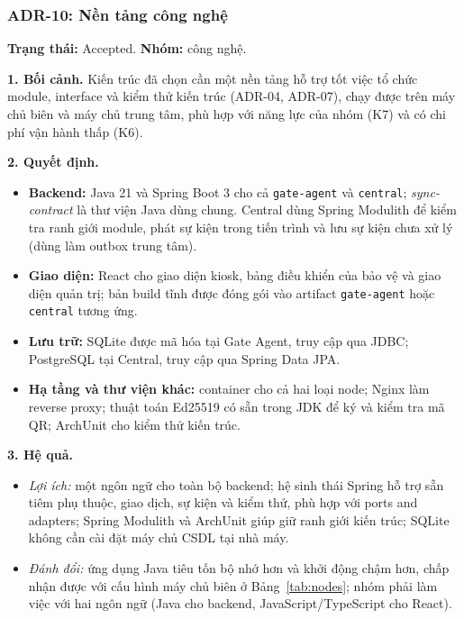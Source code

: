 \subsubsection{ADR-10: Nền tảng công nghệ}\label{adr:10}
\textbf{Trạng thái:} Accepted. \textbf{Nhóm:} công nghệ.

\noindent\textbf{1. Bối cảnh.} Kiến trúc đã chọn cần một nền tảng hỗ trợ tốt việc tổ chức module, interface và kiểm thử kiến trúc (ADR-04, ADR-07), chạy được trên máy chủ biên và máy chủ trung tâm, phù hợp với năng lực của nhóm (K7) và có chi phí vận hành thấp (K6).

\noindent\textbf{2. Quyết định.}
\begin{itemize}
    \item \textbf{Backend:} Java 21 và Spring Boot 3 cho cả \texttt{gate-agent} và \texttt{central}; \textit{sync-contract} là thư viện Java dùng chung. Central dùng Spring Modulith để kiểm tra ranh giới module, phát sự kiện trong tiến trình và lưu sự kiện chưa xử lý (dùng làm outbox trung tâm).
    \item \textbf{Giao diện:} React cho giao diện kiosk, bảng điều khiển của bảo vệ và giao diện quản trị; bản build tĩnh được đóng gói vào artifact \texttt{gate-agent} hoặc \texttt{central} tương ứng.
    \item \textbf{Lưu trữ:} SQLite được mã hóa tại Gate Agent, truy cập qua JDBC; PostgreSQL tại Central, truy cập qua Spring Data JPA.
    \item \textbf{Hạ tầng và thư viện khác:} container cho cả hai loại node; Nginx làm reverse proxy; thuật toán Ed25519 có sẵn trong JDK để ký và kiểm tra mã QR; ArchUnit cho kiểm thử kiến trúc.
\end{itemize}

\noindent\textbf{3. Hệ quả.}
\begin{itemize}
    \item \textit{Lợi ích:} một ngôn ngữ cho toàn bộ backend; hệ sinh thái Spring hỗ trợ sẵn tiêm phụ thuộc, giao dịch, sự kiện và kiểm thử, phù hợp với ports and adapters; Spring Modulith và ArchUnit giúp giữ ranh giới kiến trúc; SQLite không cần cài đặt máy chủ CSDL tại nhà máy.
    \item \textit{Đánh đổi:} ứng dụng Java tiêu tốn bộ nhớ hơn và khởi động chậm hơn, chấp nhận được với cấu hình máy chủ biên ở Bảng~\ref{tab:nodes}; nhóm phải làm việc với hai ngôn ngữ (Java cho backend, JavaScript/TypeScript cho React).
\end{itemize}

